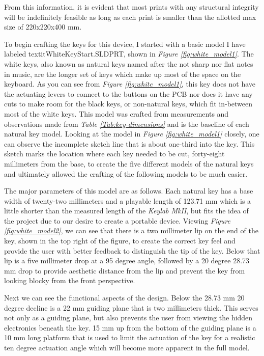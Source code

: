From this information, it is evident that most prints with any structural integrity will be indefinitely feasible as long as each print is smaller than the allotted max size of 220x220x400 mm.

To begin crafting the keys for this device, I started with a basic model I have labeled textit{WhiteKeyStart.SLDPRT}, shown in \textit{Figure \ref{fig:white_model1}}. The white keys, also known as natural keys named after the not sharp nor flat notes in music, are the longer set of keys which make up most of the space on the keyboard. As you can see from \textit{Figure \ref{fig:white_model1}}, this key does not have the actuating levers to connect to the buttons on the PCB nor does it have any cuts to make room for the black keys, or non-natural keys, which fit in-between most of the white keys. This model was crafted from measurements and observations made from \textit{Table \ref{Tab:key-dimensions}} and is the baseline of each natural key model. Looking at the model in \textit{Figure \ref{fig:white_model1}} closely, one can observe the incomplete sketch line that is about one-third into the key. This sketch marks the location where each key needed to be cut, forty-eight millimeters from the base, to create the five different models of the natural keys and ultimately allowed the crafting of the following models to be much easier.

The major parameters of this model are as follows. Each natural key has a base width of twenty-two millimeters and a playable length of 123.71 mm which is a little shorter than the measured length of the \textit{Keylab MkII}, but fits the idea of the project due to our desire to create a portable device. Viewing \textit{Figure \ref{fig:white_model2}}, we can see that there is a two millimeter lip on the end of the key, shown in the top right of the figure, to create the correct key feel and provide the user with better feedback to distinguish the tip of the key. Below that lip is a five millimeter drop at a 95 degree angle, followed by a 20 degree 28.73 mm drop to provide aesthetic distance from the lip and prevent the key from looking blocky from the front perspective.

Next we can see the functional aspects of the design. Below the 28.73 mm 20 degree decline is a 22 mm guiding plane that is two millimeters thick. This serves not only as a guiding plane, but also prevents the user from viewing the hidden electronics beneath the key. 15 mm up from the bottom of the guiding plane is a 10 mm long platform that is used to limit the actuation of the key for a realistic ten degree actuation angle which will become more apparent in the full model.

